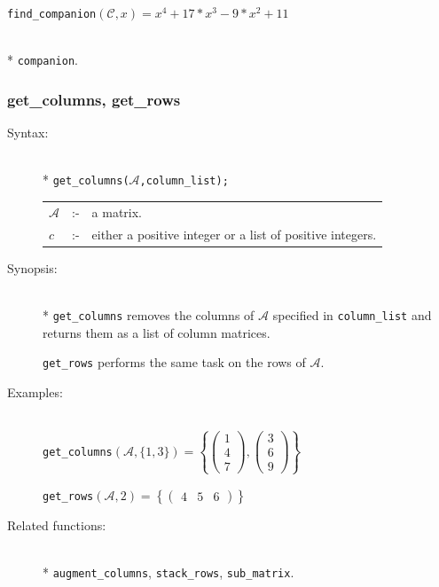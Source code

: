 {\begin{description}
  \texttt{find\_companion}\((\mathcal{C},x) = x^4+17*x^3-9*x^2+11\)

\item[Related functions:]\mbox{}\\*
\texttt{companion}.
\end{description}

\subsubsection{get\_columns, get\_rows}
\label{linalg:get_columns}
\hypertarget{operator:GET_COLUMNS}{}

\begin{description}
\item[Syntax:]\mbox{}\\*
{\tt get\_columns($\mathcal{A}$,column\_list);}\\[2mm]
\begin{tabular}{l l l}
$\mathcal{A}$ &:-& a matrix. \\
$c$          &:-& either a positive integer or a list of positive
                integers.
\end{tabular}

\item[Synopsis:]\mbox{}\\*
\texttt{get\_columns} removes the columns of $\mathcal{A}$ specified in
                \texttt{column\_list} and returns them as a list of column
                matrices.

 \texttt{get\_rows} performs the same task on the rows of
                $\mathcal{A}$.

\item[Examples:]\mbox{}\\
  \texttt{get\_columns}\((\mathcal{A},\{1,3\})  =
  \left\{
  \begin{pmatrix} 1 \\ 4 \\ 7 \end{pmatrix},
  \begin{pmatrix} 3 \\ 6 \\ 9 \end{pmatrix}
  \right\}\)

  \texttt{get\_rows}\((\mathcal{A},2)  =
  \left\{
  \begin{pmatrix} 4 & 5 & 6 \end{pmatrix}
  \right\}\)

\item[Related functions:]\mbox{}\\*
\texttt{augment\_columns}, \texttt{stack\_rows}, \texttt{sub\_matrix}.
\end{description}


}

